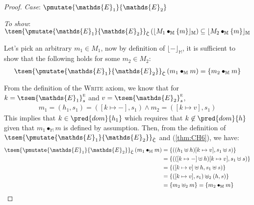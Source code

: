 {\begin{proof}
\textit{Case}: $\pmutate{\mathds{E}_1}{\mathds{E}_2}$

\textit{To show}: $\tsem{\pmutate{\mathds{E}_1}{\mathds{E}_2}}_{\hat{\mathsf{C}}} \left( \lfloor M_1 \bullet_\mathbb{M} \{m\} \rfloor_\mathbb{M} \right) \subseteq \lfloor M_2 \bullet_\mathbb{M} \{m\} \rfloor_\mathbb{M}$

Let's pick an arbitrary $m_1 \in M_1$, now by definition of $\lfloor - \rfloor_\mathbb{M}$, it is sufficient to show that the following holds for some $m_2 \in M_2$:
\begin{gather}
	\label{thm:CH5} \tsem{\pmutate{\mathds{E}_1}{\mathds{E}_2}}_{\hat{\mathsf{C}}} \left( m_1 \bullet_\mathbb{M} m \right) = \{ m_2 \bullet_\mathbb{M} m \}
\end{gather}

From the definition of the \textsc{Write} axiom, we know that for $k = \tsem{\mathds{E}_1}_s^\textsc{e}$ and $v = \tsem{\mathds{E}_2}_s^\textsc{e}$,
\begin{gather}
	\label{thm:CH6}
	m_1 = (h_1, s_1) = ([k \mapsto -], s_1) \land m_2 = ([k \mapsto v], s_1)
\end{gather}
This implies that $k \in \pred{dom}{h_1}$ which requires that $k \not\in \pred{dom}{h}$ given that $m_1 \bullet_\mathbb{M} m$ is defined by assumption. Then, from the definition of $\tsem{\pmutate{\mathds{E}_1}{\mathds{E}_2}}_{\hat{\mathsf{C}}}$ and (\ref{thm:CH6}), we have:
\begin{align*}
	\tsem{\pmutate{\mathds{E}_1}{\mathds{E}_2}}_{\hat{\mathsf{C}}} \left( m_1 \bullet_\mathbb{M} m \right)
		&=
	\{((h_1 \uplus h)[k \mapsto v], s_1 \uplus s)\} \\
		&=
	\{(([k \mapsto -] \uplus h)[k \mapsto v], s_1 \uplus s)\} \\
		&=
	\{([k \mapsto v] \uplus h, s_1 \uplus s)\} \\
		&=
	\{ ([k \mapsto v], s_1) \uplus_2 (h, s) \} \\
		&=
	\{ m_2 \uplus_2 m \} = \{ m_2 \bullet_\mathbb{M} m \}
\end{align*}
\end{proof}
}